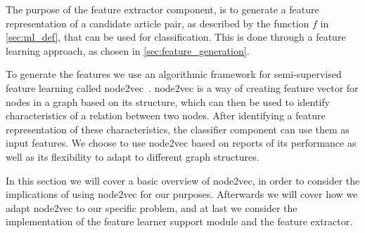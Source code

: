 The purpose of the feature extractor component, is to generate a feature representation of a candidate article pair, as described by the function $f$ in \cref{sec:ml_def}, that can be used for classification. This is done through a feature learning approach, as chosen in \cref{sec:feature_generation}.



To generate the features we use an algorithmic framework for semi-supervised feature learning called node2vec~\cite{node2vec}. node2vec is a way of creating feature vector for nodes in a graph based on its structure, which can then be used to identify characteristics of a relation between two nodes. After identifying a feature representation of these characteristics, the classifier component can use them as input features. We choose to use node2vec based on reports of its performance as well as its flexibility to adapt to different graph structures.

In this section we will cover a basic overview of node2vec, in order to consider the implications of using node2vec for our purposes. Afterwards we will cover how we adapt node2vec to our specific problem, and at last we consider the implementation of the feature learner support module and the feature extractor.



